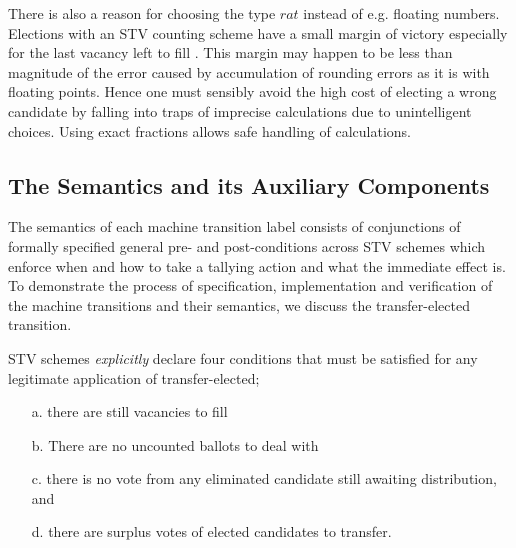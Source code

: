 \documentclass[10pt,conference]{IEEEtran}
\begin{document}
There is also a reason for choosing the type $rat$  
instead of e.g. floating numbers. Elections with an STV counting scheme have a small margin of victory especially for the last vacancy left to fill \cite{MBlo}. This margin may happen to be less than magnitude of the error caused by accumulation of rounding errors as it is with floating points.  Hence one must sensibly avoid the high  cost of electing a wrong candidate by falling into traps of imprecise calculations due to unintelligent choices. Using exact fractions allows safe handling of calculations. 
\subsection{The Semantics and its Auxiliary Components}
\label{sec:MachineSem}

The semantics of each machine transition label consists of conjunctions of formally specified general pre- and post-conditions across STV schemes which enforce when and how to take a tallying action and what the immediate effect is. To demonstrate the process of specification, implementation and verification of the machine transitions and their semantics, we discuss the transfer-elected transition.


STV schemes \emph{explicitly} declare four conditions that must be satisfied  for any legitimate application of transfer-elected; 
\begin{itemize}
\item[a.] there are still vacancies to fill
\item[b.] There are no uncounted ballots to deal with
\item[c.] there is no vote from any eliminated candidate still awaiting distribution, and
\item[d.] there are surplus votes of elected candidates to  transfer.
\end{itemize}
\end{document}

